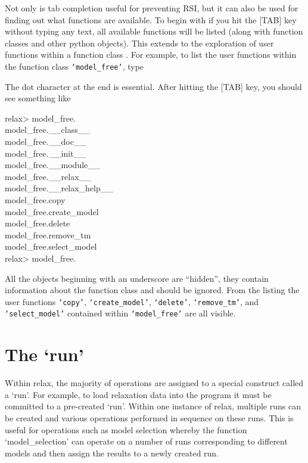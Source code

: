 Not only is tab completion useful for preventing RSI, but it can also be used for finding out what functions are available.  To begin with if you hit the [TAB] key without typing any text, all available functions will be listed (along with function classes  and other python objects).  This extends to the exploration of user functions  within a function class .  For example, to list the user functions within the function class \texttt{`model\_free'}, type


The dot character at the end is essential.  After hitting the [TAB] key, you should see something like

\begin{exampleenv}
relax> model\_free. \\
model\_free.\_\_class\_\_ \\
model\_free.\_\_doc\_\_ \\
model\_free.\_\_init\_\_ \\
model\_free.\_\_module\_\_ \\
model\_free.\_\_relax\_\_ \\
model\_free.\_\_relax\_help\_\_ \\
model\_free.copy \\
model\_free.create\_model \\
model\_free.delete \\
model\_free.remove\_tm \\
model\_free.select\_model \\
relax> model\_free. \\
\end{exampleenv}

All the objects beginning with an underscore are ``hidden'', they contain information about the function class  and should be ignored.  From the listing the user functions  \texttt{`copy'}, \texttt{`create\_model'}, \texttt{`delete'}, \texttt{`remove\_tm'}, and \texttt{`select\_model'} contained within \texttt{`model\_free'} are all visible.




\section{The `run'}

Within relax, the majority of operations are assigned to a special construct called a `run'.  For example, to load relaxation data into the program it must be committed to a pre-created `run'.  Within one instance of relax, multiple runs can be created and various operations performed in sequence on these runs.  This is useful for operations such as model selection whereby the function `model\_selection' can operate on a number of runs corresponding to different models and then assign the results to a newly created run.

